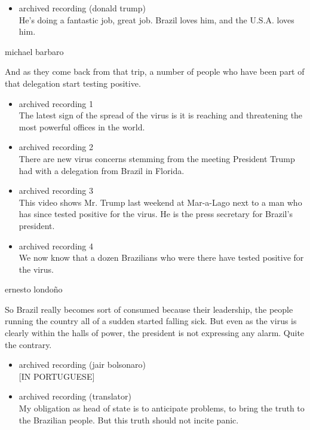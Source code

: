 \begin{itemize}
\tightlist
\item
  archived recording (donald trump)\\
  He's doing a fantastic job, great job. Brazil loves him, and the
  U.S.A. loves him.
\end{itemize}

michael barbaro

And as they come back from that trip, a number of people who have been
part of that delegation start testing positive.

\begin{itemize}
\item
  archived recording 1\\
  The latest sign of the spread of the virus is it is reaching and
  threatening the most powerful offices in the world.
\item
  archived recording 2\\
  There are new virus concerns stemming from the meeting President Trump
  had with a delegation from Brazil in Florida.
\item
  archived recording 3\\
  This video shows Mr. Trump last weekend at Mar-a-Lago next to a man
  who has since tested positive for the virus. He is the press secretary
  for Brazil's president.
\item
  archived recording 4\\
  We now know that a dozen Brazilians who were there have tested
  positive for the virus.
\end{itemize}

ernesto londoño

So Brazil really becomes sort of consumed because their leadership, the
people running the country all of a sudden started falling sick. But
even as the virus is clearly within the halls of power, the president is
not expressing any alarm. Quite the contrary.

\begin{itemize}
\item
  archived recording (jair bolsonaro)\\
  {[}IN PORTUGUESE{]}
\item
  archived recording (translator)\\
  My obligation as head of state is to anticipate problems, to bring the
  truth to the Brazilian people. But this truth should not incite panic.
\end{itemize}

